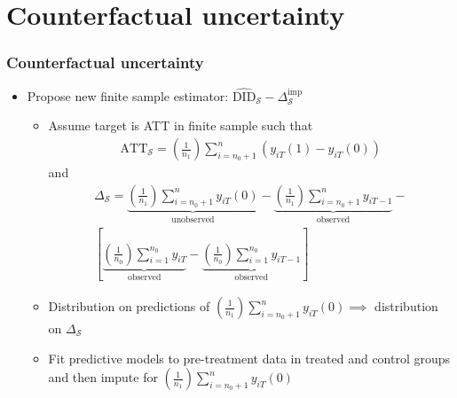 \documentclass[table, xcolor={dvipsnames}, 9pt]{beamer}
\theoremstyle{newstyle}
\begin{document}
\section{Counterfactual uncertainty}
\begin{frame}
\frametitle{Counterfactual uncertainty}
\begin{itemize}
\item Propose new finite sample estimator: $\widehat{\text{DID}}_{\mathcal{S}} - \Delta^{\text{imp}}_{\mathcal{S}}$
\begin{itemize}
\item \pause Assume target is ATT in finite sample such that \pause 
\begin{align*}
\text{ATT}_{\mathcal{S}} = \left(\frac{1}{n_1}\right) \sum \limits_{i = n_0 + 1}^n \left(y_{iT}(1) - y_{iT}(0)\right)
\end{align*}
and \pause
\begin{align*}
\Delta_{\mathcal{S}} = \underbrace{\left(\frac{1}{n_1}\right)\sum_{i = n_0 + 1}^{n} y_{iT}(0)}_{\text{unobserved}} - \underbrace{\left(\frac{1}{n_1}\right)\sum_{i = n_0 + 1}^{n} y_{iT-1}}_{\text{observed}} - \\ \left[\underbrace{\left(\frac{1}{n_0}\right)\sum_{i = 1}^{n_0} y_{iT}}_{\text{observed}} - \underbrace{\left(\frac{1}{n_0}\right)\sum_{i = 1}^{n_0} y_{iT-1}}_{\text{observed}}\right]
\end{align*} 
\item \pause Distribution on predictions of $\left(\frac{1}{n_1}\right)\sum \limits_{i = n_0 + 1}^{n} y_{iT}(0) \implies$ distribution on $\Delta_{\mathcal{S}}$
\item \pause Fit predictive models to pre-treatment data in treated and control groups and then impute for $\left(\frac{1}{n_1}\right)\sum \limits_{i = n_0 + 1}^{n} y_{iT}(0)$
\end{itemize}
\end{itemize}
\end{frame}
\end{document}

